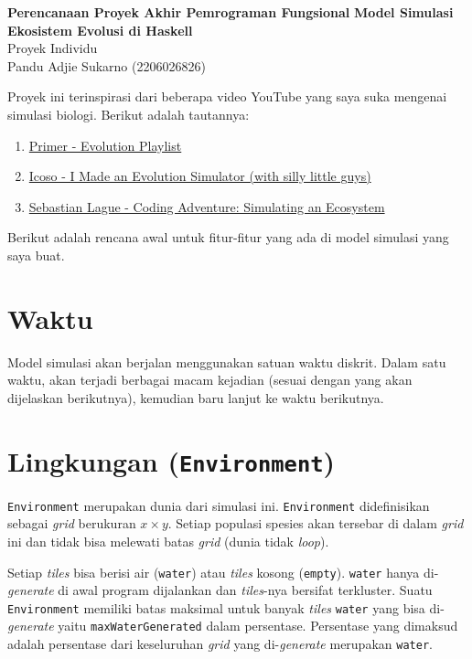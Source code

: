 \documentclass[12pt]{article}
\begin{document}
 
%
\renewcommand{\arraystretch}{1.25}

\begin{center}
    \Large
\textbf{Perencanaan Proyek Akhir Pemrograman Fungsional}
\textbf{Model Simulasi Ekosistem Evolusi di Haskell}\\
Proyek Individu\\
Pandu Adjie Sukarno (2206026826)
\end{center}
\noindent Proyek ini terinspirasi dari beberapa video YouTube yang saya suka mengenai simulasi biologi. Berikut adalah tautannya: 
\begin{enumerate}
    \item \href{https://youtube.com/playlist?list=PLKortajF2dPBWMIS6KF4RLtQiG6KQrTdB&si=hqaZhZ-h92zkJozj}{Primer - Evolution Playlist}
    \item \href{https://youtu.be/f7vH2Li9KOw?si=k78nDUqfp5TPhn00}{Icoso - I Made an Evolution Simulator (with silly little guys)}
    \item \href{https://youtu.be/r_It_X7v-1E?si=YXpYhTIrnf76xXY_}{Sebastian Lague - Coding Adventure: Simulating an Ecosystem}
\end{enumerate}
Berikut adalah rencana awal untuk fitur-fitur yang ada di model simulasi yang saya buat.
\section{Waktu}
Model simulasi akan berjalan menggunakan satuan waktu diskrit. Dalam satu waktu, akan terjadi berbagai macam kejadian (sesuai dengan yang akan dijelaskan berikutnya), kemudian baru lanjut ke waktu berikutnya. 
\section{Lingkungan (\texttt{Environment})}
\texttt{Environment} merupakan dunia dari simulasi ini. \texttt{Environment} didefinisikan sebagai \textit{grid} berukuran $x\times y$. Setiap populasi spesies akan tersebar di dalam \textit{grid} ini dan tidak bisa melewati batas \textit{grid} (dunia tidak \textit{loop}). 

\noindent Setiap \textit{tiles} bisa berisi air (\texttt{water}) atau \textit{tiles} kosong (\texttt{empty}). \texttt{water} hanya di-\textit{generate} di awal program dijalankan dan \textit{tiles}-nya bersifat terkluster. Suatu \texttt{Environment} memiliki batas maksimal untuk banyak \textit{tiles} \texttt{water} yang bisa di-\textit{generate} yaitu \texttt{maxWaterGenerated} dalam persentase. Persentase yang dimaksud adalah persentase dari keseluruhan \textit{grid} yang di-\textit{generate} merupakan \texttt{water}.
\end{document}
